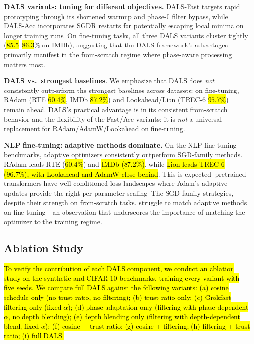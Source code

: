\documentclass[a4paper,fleqn]{cas-dc}
\begin{document}
\textbf{DALS variants: tuning for different objectives.} DALS-Fast targets rapid prototyping through its shortened warmup and phase-0 filter bypass, while DALS-Acc incorporates SGDR restarts for potentially escaping local minima on longer training runs. On fine-tuning tasks, all three DALS variants cluster tightly (\hl{85.5}--\hl{86.3}\% on IMDb), suggesting that the DALS framework's advantages primarily manifest in the from-scratch regime where phase-aware processing matters most.

\textbf{DALS vs.\ strongest baselines.} We emphasize that DALS does \emph{not} consistently outperform the strongest baselines across datasets: on fine-tuning, RAdam (RTE \hl{60.4\%}, IMDb \hl{87.2\%}) and Lookahead/Lion (TREC-6 \hl{96.7\%}) remain ahead. DALS's practical advantage is in its consistent from-scratch behavior and the flexibility of the Fast/Acc variants; it is \emph{not} a universal replacement for RAdam/AdamW/Lookahead on fine-tuning.

\textbf{NLP fine-tuning: adaptive methods dominate.} On the NLP fine-tuning benchmarks, adaptive optimizers consistently outperform SGD-family methods. RAdam leads RTE (\hl{60.4\%}) and \hl{IMDb (87.2\%)}, while \hl{Lion leads TREC-6 (96.7\%), with Lookahead and AdamW close behind}. This is expected: pretrained transformers have well-conditioned loss landscapes where Adam's adaptive updates provide the right per-parameter scaling. The SGD-family strategies, despite their strength on from-scratch tasks, struggle to match adaptive methods on fine-tuning---an observation that underscores the importance of matching the optimizer to the training regime.

\subsection{Ablation Study}\label{sec:ablation}

\hl{To verify the contribution of each DALS component, we conduct an ablation study on the synthetic and CIFAR-10 benchmarks, training every variant with five seeds. We compare full DALS against the following variants: (a) cosine schedule only (no trust ratio, no filtering); (b) trust ratio only; (c) Grokfast filtering only (fixed $\alpha$); (d) phase adaptation only (filtering with phase-dependent $\alpha$, no depth blending); (e) depth blending only (filtering with depth-dependent blend, fixed $\alpha$); (f) cosine + trust ratio; (g) cosine + filtering; (h) filtering + trust ratio; (i) full DALS.}
\end{document}
